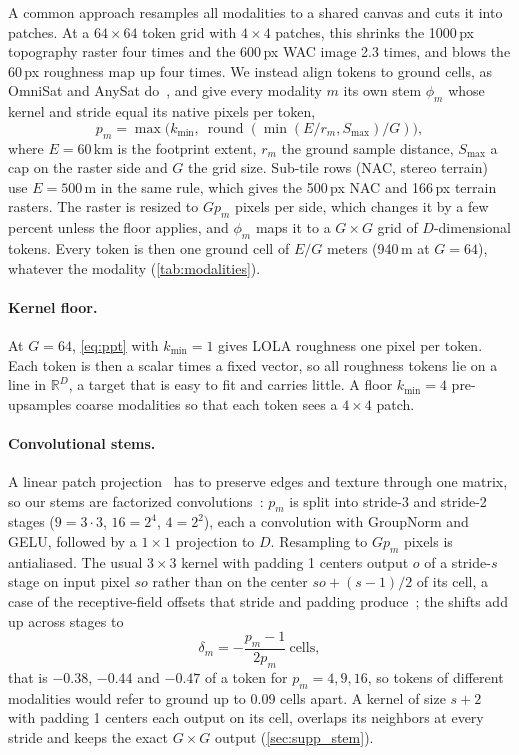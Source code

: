 A common approach resamples all modalities to a shared canvas and cuts it into patches. At a $64\times64$ token grid with $4\times4$ patches, this shrinks the 1000\,px topography raster four times and the 600\,px WAC image 2.3 times, and blows the 60\,px roughness map up four times. We instead align tokens to ground cells, as OmniSat and AnySat do~\cite{astruc2024omnisat,astruc2025anysat}, and give every modality $m$ its own stem $\phi_m$ whose kernel and stride equal its native pixels per token,
\begin{equation}
  p_m = \max\!\big(k_{\min},\ \operatorname{round}(\min(E/r_m, S_{\max})/G)\big),
  \label{eq:ppt}
\end{equation}
where $E{=}60$\,km is the footprint extent, $r_m$ the ground sample distance, $S_{\max}$ a cap on the raster side and $G$ the grid size. Sub-tile rows (NAC, stereo terrain) use $E{=}500$\,m in the same rule, which gives the 500\,px NAC and 166\,px terrain rasters. The raster is resized to $Gp_m$ pixels per side, which changes it by a few percent unless the floor applies, and $\phi_m$ maps it to a $G\times G$ grid of $D$-dimensional tokens. Every token is then one ground cell of $E/G$ meters (940\,m at $G{=}64$), whatever the modality (\cref{tab:modalities}).

\paragraph{Kernel floor.} At $G{=}64$, \cref{eq:ppt} with $k_{\min}{=}1$ gives LOLA roughness one pixel per token. Each token is then a scalar times a fixed vector, so all roughness tokens lie on a line in $\mathbb{R}^D$, a target that is easy to fit and carries little. A floor $k_{\min}{=}4$ pre-upsamples coarse modalities so that each token sees a $4\times4$ patch.

\paragraph{Convolutional stems.} A linear patch projection~\cite{dosovitskiy2021image} has to preserve edges and texture through one matrix, so our stems are factorized convolutions~\cite{xiao2021early}: $p_m$ is split into stride-3 and stride-2 stages ($9{=}3{\cdot}3$, $16{=}2^4$, $4{=}2^2$), each a convolution with GroupNorm and GELU, followed by a $1\times1$ projection to $D$. Resampling to $Gp_m$ pixels is antialiased. The usual $3\times3$ kernel with padding 1 centers output $o$ of a stride-$s$ stage on input pixel $so$ rather than on the center $so+(s{-}1)/2$ of its cell, a case of the receptive-field offsets that stride and padding produce~\cite{araujo2019computing,alsallakh2021mind}; the shifts add up across stages to
\begin{equation}
  \delta_m = -\frac{p_m-1}{2p_m}\ \text{cells},
  \label{eq:shift}
\end{equation}
that is $-0.38$, $-0.44$ and $-0.47$ of a token for $p_m = 4, 9, 16$, so tokens of different modalities would refer to ground up to 0.09 cells apart. A kernel of size $s{+}2$ with padding 1 centers each output on its cell, overlaps its neighbors at every stride and keeps the exact $G\times G$ output (\cref{sec:supp_stem}).

